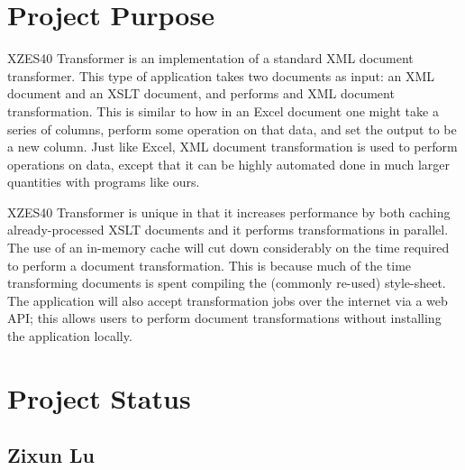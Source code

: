 \section{Project Purpose}

XZES40 Transformer is an implementation of a standard XML document transformer.
This type of application takes two documents as input: an XML document and an XSLT document, and performs and XML document transformation.
This is similar to how in an Excel document one might take a series of columns, perform some operation on that data, and set the output to be a new column.
Just like Excel, XML document transformation is used to perform operations on data, except that it can be highly automated done in much larger quantities with programs like ours.

XZES40 Transformer is unique in that it increases performance by both caching already-processed XSLT documents and it performs transformations in parallel.
The use of an in-memory cache will cut down considerably on the time required to perform a document transformation.
This is because much of the time transforming documents is spent compiling the (commonly re-used) style-sheet.
The application will also accept transformation jobs over the internet via a web API; this allows users to perform document transformations without installing the application locally.

\section{Project Status}

\subsection{Zixun Lu}

